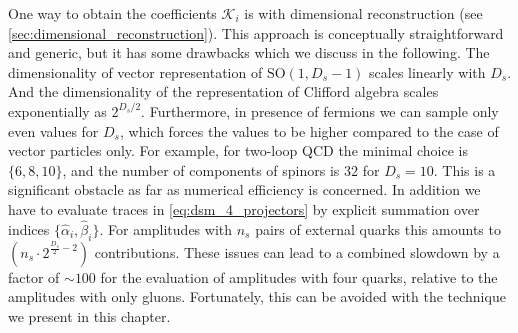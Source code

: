 One way to obtain the coefficients $\mathcal{K}_i$ 
is with dimensional reconstruction (see \cref{sec:dimensional_reconstruction}).
This approach is conceptually straightforward and generic, 
but it has some drawbacks which we discuss in the following.
The dimensionality of vector representation of $\mathrm{SO}(1,D_s-1)$ scales linearly with $D_s$.
And the dimensionality of the representation of Clifford algebra scales exponentially as $2^{D_s/2}$.
Furthermore, in presence of fermions we can sample only even values for $D_s$,
which forces the values to be higher compared to the case of vector particles only.
For example, for two-loop QCD the minimal choice is $\{6,8,10\}$, and the number of components
of spinors is $32$ for $D_s=10$. 
This is a significant obstacle as far as numerical efficiency is concerned.
In addition we have to evaluate traces in \cref{eq:dsm_4_projectors} by explicit summation
over indices $\{\hat{\alpha}_i,\hat{\beta}_i\}$.
For amplitudes with $n_s$ pairs of external quarks this amounts to $(n_s \cdot 2^{\frac{D_s}{2}-2})$ contributions.
These issues can lead to a combined slowdown by a factor of $\sim 100$ 
for the evaluation of amplitudes with four quarks, relative to the amplitudes with only gluons.
Fortunately, this can be avoided with the technique we present in this chapter.

